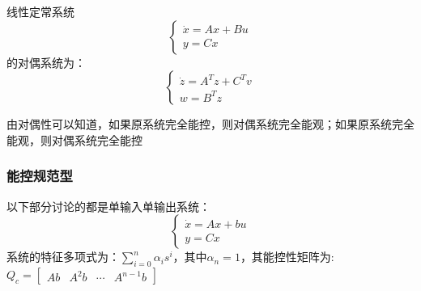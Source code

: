 \begin{definition}[对偶系统]
    线性定常系统
    \begin{equation*}
        \begin{cases}
            \dot{x} = A x + B u \\
            y = C x
        \end{cases}
    \end{equation*}
    的对偶系统为：
    \begin{equation*}
        \begin{cases}
            \dot{z} = A^T z + C^T v\\
            w = B^T z
        \end{cases}
    \end{equation*}

    由对偶性可以知道，如果原系统完全能控，则对偶系统完全能观；如果原系统完全能观，则对偶系统完全能控
\end{definition}

\subsubsection{能控规范型}

以下部分讨论的都是单输入单输出系统：
\begin{equation*}
    \begin{cases}
        \dot{x} = A x + b u \\
        y = C x
    \end{cases}
\end{equation*}
系统的特征多项式为：$\sum\limits_{i=0}^n \alpha_i s^i$，其中$\alpha_n = 1$，其能控性矩阵为:$Q_c = [
    \begin{array}{cccc}
        Ab & A^2 b & \cdots & A^{n-1} b
    \end{array}
]$

